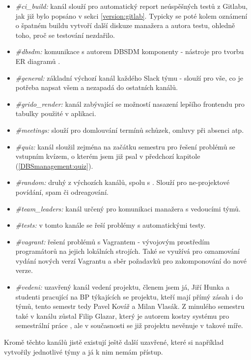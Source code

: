 \begin{itemize}
	\item \emph{\#ci\_build:} kanál slouží pro automatický report neúspěšných testů z Gitlabu, jak již bylo popsáno v sekci \ref{version:gitlab}. Typicky se poté kolem oznámení o špatném buildu vytvoří další diskuze manažera a autora testu, ohledně toho, proč se testování nezdařilo.
	\item \emph{\#dbsdm:} komunikace s autorem DBSDM komponenty - nástroje pro tvorbu ER diagramů \cite{fedor}.
	\item \emph{\#general:} základní výchozí kanál každého Slack týmu - slouží pro vše, co je potřeba napsat všem a nezapadá do ostatních kanálů.
	\item \emph{\#grido\_render:} kanál zabývající se možností nasazení lepšího frontendu pro tabulky použité v aplikaci.
	\item \emph{\#meetings:} slouží pro domlouvání termínů schůzek, omluvy při absenci atp.
	\item \emph{\#quiz:} kanál sloužil zejména na začátku semestru pro řešení problémů se vstupním kvízem, o kterém jsem již psal v předchozí kapitole (\ref{DBSmanagement:quiz}).
	\item \emph{\#random:} druhý z výchozích kanálů, spolu s . Slouží pro ne-projektové povídání, spam či odreagování.
	\item \emph{\#team\_leaders:} kanál určený pro komunikaci manažera s vedoucími týmů.
	\item \emph{\#tests:} v tomto kanále se řeší problémy s automatickými testy.
	\item \emph{\#vagrant:} řešení problémů s Vagrantem - vývojovým prostředím programátorů na jejich lokálních strojích. Také se využívá pro oznamování vydání nových verzí Vagrantu a sběr požadavků pro zakomponování do nové verze.
	\item \emph{\#vedeni:} uzavřený kanál vedení projektu, členem jsem já, Jiří Hunka a studenti pracující na BP týkajících se projektu, kteří mají přímý zásah i do týmů, tento semestr tedy Pavel Kovář a Milan Vlasák. Z minulého semestru také v kanálu zůstal Filip Glazar, který je autorem kostry systému pro semestrální práce \cite{glazar}, ale v současnosti se již projektu nevěnuje v takové míře.
\end{itemize}
Kromě těchto kanálů jistě existují ještě další uzavřené, které si například vytvořily jednotlivé týmy a já k nim nemám přístup.
